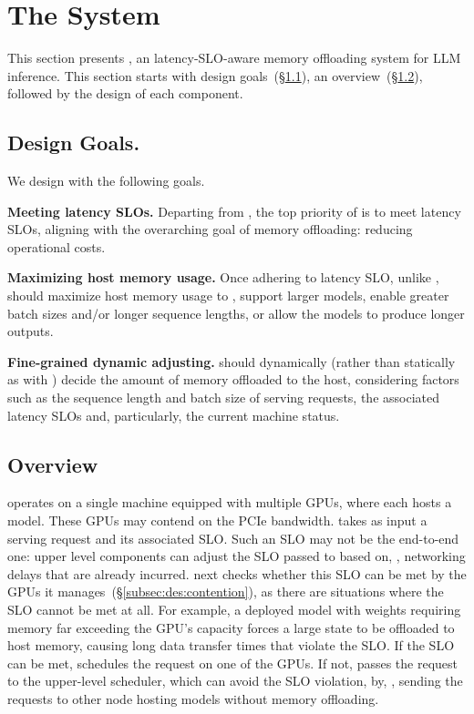 \section{The \sys System}

This section presents \sys, an latency-SLO-aware memory offloading 
system for LLM inference. 
%
This section starts with \syss design goals~(\S\ref{sec:designgoals}), an overview~(\S\ref{sec:overview}), followed by the design of each  component.

\subsection{Design Goals.}
\label{sec:designgoals}
%
We design \sys with the following goals. 

\squishlist
%
\item{\textbf{Meeting latency SLOs.}}
%
Departing from \deepspeed, the top priority of \sys is to meet latency SLOs, aligning with the overarching goal of memory offloading: reducing operational costs. 

\item{\textbf{Maximizing host memory usage.}}
%
Once adhering to latency SLO, unlike \flexgen, \sys should maximize host memory usage to \eg, support larger models, enable greater batch sizes and/or longer sequence lengths, or allow the models to produce longer outputs. 

\item{\textbf{Fine-grained dynamic adjusting.}}
%
\sys should dynamically (rather than statically as with \flexgen) decide the amount of memory offloaded to the host, considering factors such as the sequence length and batch size of serving requests, the associated latency SLOs and, particularly, the current machine status.
\squishend

\subsection{Overview}
\label{sec:overview}

%
\sys operates on a single machine equipped with multiple GPUs, where each hosts a model. 
%
These GPUs may contend on the PCIe bandwidth. 
%
\sys takes as input a serving request and its associated SLO. 
%
Such an SLO may not be the end-to-end one: upper level components can adjust the SLO passed to \sys based on, \eg, networking delays that are 
already incurred. 
%
\sys next checks whether this SLO can be met by the GPUs it 
manages~(\S\ref{subsec:des:contention}), as there are situations where 
the SLO cannot be met at all. 
%
For example, a deployed model with weights requiring memory far exceeding the GPU's capacity forces a large state to be offloaded to host memory, 
causing long data transfer times that violate the SLO. 
%
If the SLO can be met, \sys schedules the request on one of the GPUs. 
%
If not, \sys passes the request to the upper-level scheduler, which can 
avoid the SLO violation, by, \eg, sending the requests to other node hosting
models without memory offloading. 
%

